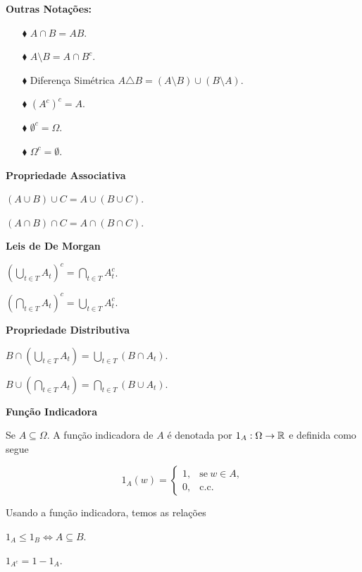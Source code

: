 \textbf{Outras Notações:}

\begin{enumerate}
\item[$\blacklozenge$] $ A \cap B = AB$.
\item[$\blacklozenge$] $A \setminus B = A \cap B^c$.
\item[$\blacklozenge$] Diferença Simétrica $A\triangle B = (A \setminus B) \cup (B\setminus A).$
\item[$\blacklozenge$] $(A^c)^c = A $.
\item[$\blacklozenge$] $\emptyset^c = \Omega$.
\item[$\blacklozenge$] $\Omega^c = \emptyset$.
\end{enumerate}

\textbf{Propriedade Associativa}

$(A\cup B)\cup C= A \cup ( B \cup C)$.

$(A\cap B)\cap C= A \cap ( B \cap C)$.

\vspace*{1cm}
\textbf{Leis de De Morgan}

$\left( \displaystyle\bigcup_{t \in T}{A_t} \right)^c = \displaystyle\bigcap_{t \in T}{A_t^c}$.

$\left( \displaystyle\bigcap_{t \in T}{A_t} \right)^c = \displaystyle\bigcup_{t \in T}{A_t^c}$.


\vspace*{1cm}
\textbf{Propriedade Distributiva}

$B \cap \left( \displaystyle\bigcup_{t \in T}{A_t} \right) = \displaystyle\bigcup_{t \in T}{(B\cap A_t)} $.

$B \cup \left( \displaystyle\bigcap_{t \in T}{A_t} \right) = \displaystyle\bigcap_{t \in T}{(B\cup A_t)} $.

\vspace*{1cm}
\textbf{Função Indicadora}

Se $A \subseteq \Omega$. A função indicadora de $A$ é denotada por $1_A: \Omega \to \mathbb{R}$ e definida 
como segue

$$
	1_A(w) =
	\begin{cases}
		1, & \text{se}\ w \in A, \\
		0, & \text{c.c.}
	\end{cases}
$$

\begin{observacao} Usando a função indicadora, temos as relações

$1_A \leqslant 1_B \Leftrightarrow A \subseteq B$.

$1_{A^c}= 1- 1_A$.
\end{observacao}


